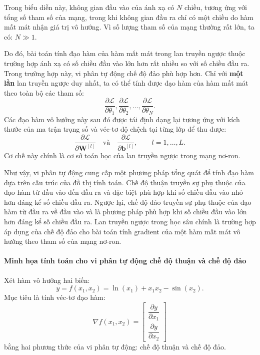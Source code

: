 Trong biểu diễn này, không gian đầu vào của ánh xạ có $N$ chiều, tương ứng với tổng số tham số của mạng, trong khi không gian đầu ra chỉ có một chiều do hàm mất mát nhận giá trị vô hướng. Vì số lượng tham số của mạng thường rất lớn, ta có: $N\gg 1.$


Do đó, bài toán tính đạo hàm của hàm mất mát trong lan truyền ngược thuộc trường hợp ánh xạ có số chiều đầu vào lớn hơn rất nhiều so với số chiều đầu ra. Trong trường hợp này, vi phân tự động chế độ đảo phù hợp hơn. Chỉ với \textbf{một lần} lan truyền ngược duy nhất, ta có thể tính được đạo hàm của hàm mất mát theo toàn bộ các tham số:
\begin{equation}
\frac{\partial \mathcal{L}}{\partial \theta_1}, \frac{\partial \mathcal{L}}{\partial \theta_2}, \dots, \frac{\partial \mathcal{L}}{\partial \theta_N}.
\end{equation}
Các đạo hàm vô hướng này sau đó được tái định dạng lại tương ứng với kích thước của ma trận trọng số và véc-tơ độ chệch tại từng lớp để thu được:
\begin{equation}
\frac{\partial \mathcal{L}}{\partial \mathbf{W}^{[l]}} \quad \text{và} \quad \frac{\partial \mathcal{L}}{\partial \mathbf{b}^{[l]}}, \qquad l = 1, \dots, L.
\end{equation}
Cơ chế này chính là cơ sở toán học của lan truyền ngược trong mạng nơ-ron.

Như vậy, vi phân tự động cung cấp một phương pháp tổng quát để tính đạo hàm dựa trên cấu trúc của đồ thị tính toán. Chế độ thuận truyền sự phụ thuộc của đạo hàm từ đầu vào đến đầu ra và đặc biệt phù hợp khi số chiều đầu vào nhỏ hơn đáng kể số chiều đầu ra. Ngược lại, chế độ đảo truyền sự phụ thuộc của đạo hàm từ đầu ra về đầu vào và là phương pháp phù hợp khi số chiều đầu vào lớn hơn đáng kể số chiều đầu ra. Lan truyền ngược trong học sâu chính là trường hợp áp dụng của chế độ đảo cho bài toán tính gradient của một hàm mất mát vô hướng theo tham số của mạng nơ-ron.
\paragraph{Minh họa tính toán cho vi phân tự động chế độ thuận và chế độ đảo\\}
Xét hàm vô hướng hai biến:
\begin{equation}
    y = f(x_1,x_2) = \ln(x_1) + x_1 x_2 - \sin(x_2).
    \label{eq:ad_example_function}
\end{equation}
Mục tiêu là tính véc-tơ đạo hàm:
\begin{equation}
    \nabla f(x_1,x_2) = 
    \begin{bmatrix}
        \dfrac{\partial y}{\partial x_1} \\[6pt]
        \dfrac{\partial y}{\partial x_2}
    \end{bmatrix}
\end{equation}
bằng hai phương thức của vi phân tự động: chế độ thuận và chế độ đảo.

